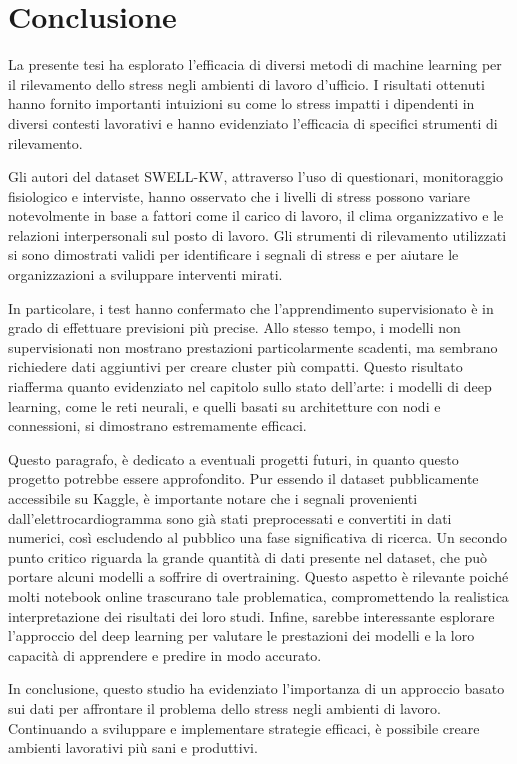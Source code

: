 \pagestyle{fancy}

\fancyhf{}

\fancyfoot[C]{\thepage}


\chapter{Conclusione}

\large

La presente tesi ha esplorato l'efficacia di diversi metodi di machine learning per il rilevamento dello stress negli ambienti di lavoro d'ufficio. I risultati ottenuti hanno fornito importanti intuizioni su come lo stress impatti i dipendenti in diversi contesti lavorativi e hanno evidenziato l'efficacia di specifici strumenti di rilevamento.

\bigskip

Gli autori del dataset SWELL-KW, attraverso l'uso di questionari, monitoraggio fisiologico e interviste, hanno osservato che i livelli di stress possono variare notevolmente in base a fattori come il carico di lavoro, il clima organizzativo e le relazioni interpersonali sul posto di lavoro. Gli strumenti di rilevamento utilizzati si sono dimostrati validi per identificare i segnali di stress e per aiutare le organizzazioni a sviluppare interventi mirati.

\bigskip

In particolare, i test hanno confermato che l'apprendimento supervisionato è in grado di effettuare previsioni più precise. Allo stesso tempo, i modelli non supervisionati non mostrano prestazioni particolarmente scadenti, ma sembrano richiedere dati aggiuntivi per creare cluster più compatti. Questo risultato riafferma quanto evidenziato nel capitolo sullo stato dell'arte: i modelli di deep learning, come le reti neurali, e quelli basati su architetture con nodi e connessioni, si dimostrano estremamente efficaci.

\bigskip

Questo paragrafo, è dedicato a eventuali progetti futuri, in quanto questo progetto potrebbe essere approfondito. Pur essendo il dataset pubblicamente accessibile su Kaggle, è importante notare che i segnali provenienti dall'elettrocardiogramma sono già stati preprocessati e convertiti in dati numerici, così escludendo al pubblico una fase significativa di ricerca. Un secondo punto critico riguarda la grande quantità di dati presente nel dataset, che può portare alcuni modelli a soffrire di overtraining. Questo aspetto è rilevante poiché molti notebook online trascurano tale problematica, compromettendo la realistica interpretazione dei risultati dei loro studi. Infine, sarebbe interessante esplorare l'approccio del deep learning per valutare le prestazioni dei modelli e la loro capacità di apprendere e predire in modo accurato.

\bigskip

In conclusione, questo studio ha evidenziato l'importanza di un approccio basato sui dati per affrontare il problema dello stress negli ambienti di lavoro. Continuando a sviluppare e implementare strategie efficaci, è possibile creare ambienti lavorativi più sani e produttivi.